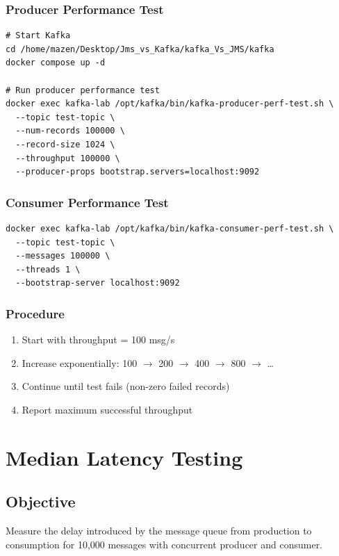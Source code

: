 \documentclass[11pt,a4paper]{article}
\begin{document}
\subsubsection{Producer Performance Test}
\begin{lstlisting}[style=bashstyle, caption=Kafka Producer Throughput Test]
# Start Kafka
cd /home/mazen/Desktop/Jms_vs_Kafka/kafka_Vs_JMS/kafka
docker compose up -d

# Run producer performance test
docker exec kafka-lab /opt/kafka/bin/kafka-producer-perf-test.sh \
  --topic test-topic \
  --num-records 100000 \
  --record-size 1024 \
  --throughput 100000 \
  --producer-props bootstrap.servers=localhost:9092
\end{lstlisting}

\subsubsection{Consumer Performance Test}
\begin{lstlisting}[style=bashstyle, caption=Kafka Consumer Throughput Test]
docker exec kafka-lab /opt/kafka/bin/kafka-consumer-perf-test.sh \
  --topic test-topic \
  --messages 100000 \
  --threads 1 \
  --bootstrap-server localhost:9092
\end{lstlisting}

\subsubsection{Procedure}
\begin{enumerate}[leftmargin=*,nosep]
    \item Start with throughput = 100 msg/s
    \item Increase exponentially: 100 $\rightarrow$ 200 $\rightarrow$ 400 $\rightarrow$ 800 $\rightarrow$ \ldots
    \item Continue until test fails (non-zero failed records)
    \item Report maximum successful throughput
\end{enumerate}

\newpage
\section{Median Latency Testing}

\subsection{Objective}
Measure the delay introduced by the message queue from production to consumption
for 10,000 messages with concurrent producer and consumer.
\end{document}
